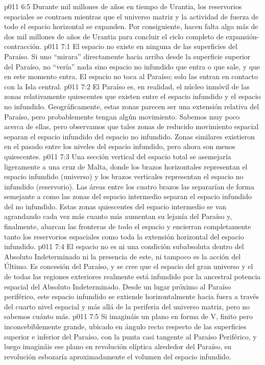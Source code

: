 \vs p011 6:5 Durante mil millones de años en tiempo de Urantia, los reservorios espaciales se contraen mientras que el universo matriz y la actividad de fuerza de todo el espacio horizontal se expanden. Por consiguiente, hacen falta algo más de dos mil millones de años de Urantia para concluir el ciclo completo de expansión\hyp{}contracción.
\vs p011 7:1 El espacio no existe en ninguna de las superficies del Paraíso. Si uno “mirara” directamente hacia arriba desde la superficie superior del Paraíso, no “vería” nada sino espacio no infundido que entra o que sale, y que en este momento entra. El espacio no toca al Paraíso; solo las  entran en contacto con la Isla central.
\vs p011 7:2 El Paraíso es, en realidad, el núcleo inmóvil de las zonas relativamente quiescentes que existen entre el espacio infundido y el espacio no infundido. Geográficamente, estas zonas parecen ser una extensión relativa del Paraíso, pero probablemente tengan algún movimiento. Sabemos muy poco acerca de ellas, pero observamos que tales zonas de reducido movimiento espacial separan el espacio infundido del espacio no infundido. Zonas similares existieron en el pasado entre los niveles del espacio infundido, pero ahora son menos quiescentes.
\vs p011 7:3 Una sección vertical del espacio total se asemejaría ligeramente a una cruz de Malta, donde los brazos horizontales representan el espacio infundido (universo) y los brazos verticales representan el espacio no infundido (reservorio). Las áreas entre los cuatro brazos las separarían de forma semejante a como las zonas del espacio intermedio separan el espacio infundido del no infundido. Estas zonas quiescentes del espacio intermedio se van agrandando cada vez más cuanto más aumentan su lejanía del Paraíso y, finalmente, abarcan las fronteras de todo el espacio y encierran completamente tanto los reservorios espaciales como toda la extensión horizontal del espacio infundido.
\vs p011 7:4 \pc El espacio no es ni una condición subabsoluta dentro del Absoluto Indeterminado ni la presencia de este, ni tampoco es la acción del Último. Es concesión del Paraíso, y se cree que el espacio del gran universo y el de todas las regiones exteriores realmente está infundido por la ancestral potencia espacial del Absoluto Indeterminado. Desde un lugar próximo al Paraíso periférico, este espacio infundido se extiende horizontalmente hacia fuera a través del cuarto nivel espacial y más allá de la periferia del universo matriz, pero no sabemos cuánto más.
\vs p011 7:5 Si imagináis un plano en forma de V, finito pero inconcebiblemente grande, ubicado en ángulo recto respecto de las superficies superior e inferior del Paraíso, con la punta casi tangente al Paraíso Periférico, y luego imagináis ese plano en revolución elíptica alrededor del Paraíso, su revolución esbozaría aproximadamente el volumen del espacio infundido.
